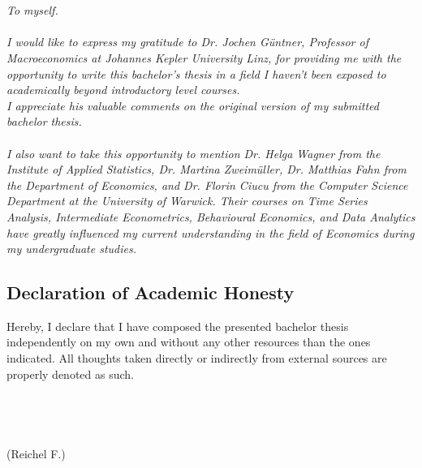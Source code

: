 

{%
	\chapter*{}

\textit{
To myself.\\ \\
I would like to express my gratitude to Dr. Jochen Güntner, Professor of Macroeconomics at Johannes Kepler University Linz, for providing me with the opportunity to write this bachelor's thesis in a field I haven't been exposed to academically beyond introductory level courses. \\
I appreciate his valuable comments on the original version of my submitted bachelor thesis.\\ \\
I also want to take this opportunity to mention Dr. Helga Wagner from the Institute of Applied Statistics, Dr. Martina Zweimüller, Dr. Matthias Fahn from the Department of Economics, and Dr. Florin Ciucu from the Computer Science Department at the University of Warwick. Their courses on Time Series Analysis, Intermediate Econometrics, Behavioural Economics, and Data Analytics have greatly influenced my current understanding in the field of Economics during my undergraduate studies.
}

\newpage

\section*{Declaration of Academic Honesty}


Hereby, I declare that I have composed the presented bachelor thesis independently on my own
and without any other resources than the ones indicated. All thoughts taken directly or
indirectly from external sources are properly denoted as such.\\
\\ \\ \\ \\ 
(Reichel F.)



}
